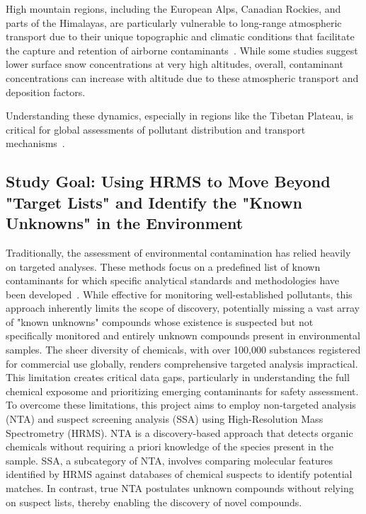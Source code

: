 \documentclass[11pt]{article}
\begin{document}
\begin{doublespace}
    High mountain regions, including the European Alps, Canadian Rockies, and parts of the Himalayas, are particularly vulnerable to long-range atmospheric transport due to their unique topographic and climatic conditions that facilitate the capture and retention of airborne contaminants~\cite{Wenkai}.
    While some studies suggest lower surface snow concentrations at very high altitudes, overall, contaminant concentrations can increase with altitude due to these atmospheric transport and deposition factors.

    Understanding these dynamics, especially in regions like the Tibetan Plateau, is critical for global assessments of pollutant distribution and transport mechanisms~\cite{Wenkai}.

    \subsection{Study Goal: Using HRMS to Move Beyond "Target Lists" and Identify the "Known Unknowns" in the Environment}
        Traditionally, the assessment of environmental contamination has relied heavily on targeted analyses. These methods focus on a predefined list of known contaminants for which specific analytical standards and methodologies have been developed~\cite{Chao2025,Manz}.
        While effective for monitoring well-established pollutants, this approach inherently limits the scope of discovery, potentially missing a vast array of "known unknowns" compounds whose existence is suspected but not specifically monitored and entirely unknown compounds present in environmental samples.
        The sheer diversity of chemicals, with over 100,000 substances registered for commercial use globally, renders comprehensive targeted analysis impractical.
        This limitation creates critical data gaps, particularly in understanding the full chemical exposome and prioritizing emerging contaminants for safety assessment.
        To overcome these limitations, this project aims to employ non-targeted analysis (NTA) and suspect screening analysis (SSA) using High-Resolution Mass Spectrometry (HRMS).
        NTA is a discovery-based approach that detects organic chemicals without requiring a priori knowledge of the species present in the sample.
        SSA, a subcategory of NTA, involves comparing molecular features identified by HRMS against databases of chemical suspects to identify potential matches.
        In contrast, true NTA postulates unknown compounds without relying on suspect lists, thereby enabling the discovery of novel compounds.

\end{doublespace}
\end{document}

